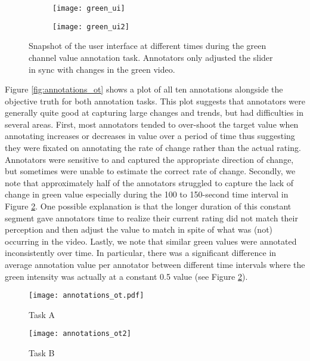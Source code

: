 \documentclass[times,twocolumn,final,authoryear]{elsarticle}
\begin{document}
\begin{figure}
	\centering
	\begin{subfigure}{0.49\columnwidth}
	\texttt{[image: green\_ui]}
	\end{subfigure}
	\begin{subfigure}{0.49\columnwidth}
	\texttt{[image: green\_ui2]}
	\end{subfigure}
	\caption{Snapshot of the user interface at different times during the green channel value annotation task.  Annotators only adjusted the slider in sync with changes in the green video.}
	\label{fig:annotation_ui}
\end{figure}

Figure \ref{fig:annotations_ot} shows a plot of all ten annotations alongside the objective truth for both annotation tasks.  This plot suggests that annotators were generally quite good at capturing large changes and trends, but had difficulties in several areas.  First, most annotators tended to over-shoot the target value when annotating increases or decreases in value over a period of time thus suggesting they were fixated on annotating the rate of change rather than the actual rating.  Annotators were sensitive to and captured the appropriate direction of change, but sometimes were unable to estimate the correct rate of change.  Secondly, we note that approximately half of the annotators struggled to capture the lack of change in green value especially during the 100 to 150-second time interval in Figure \ref{fig:annotations_ot_a}.  One possible explanation is that the longer duration of this constant segment gave annotators time to realize their current rating did not match their perception and then adjust the value to match in spite of what was (not) occurring in the video.  Lastly, we note that similar green values were annotated inconsistently over time.  In particular, there was a significant difference in average annotation value per annotator between different time intervals where the green intensity was actually at a constant 0.5 value (see Figure \ref{fig:annotations_ot_a}).

\begin{figure*}[t]
	\centering
	\begin{subfigure}{0.49\textwidth}
	\texttt{[image: annotations\_ot.pdf]}
	\caption{\footnotesize Task A \hspace*{1.2cm}}
	\label{fig:annotations_ot_a}
	\end{subfigure}
	\begin{subfigure}{0.49\textwidth}
	\texttt{[image: annotations\_ot2]}
	\caption{\footnotesize Task B \hspace*{1cm}}
	\label{fig:annotations_ot_b}
	\end{subfigure}
	\caption{Annotations of green channel values alongside the true value in two separate annotation tasks.}
	\label{fig:annotations_ot}
\end{figure*}
\end{document}
